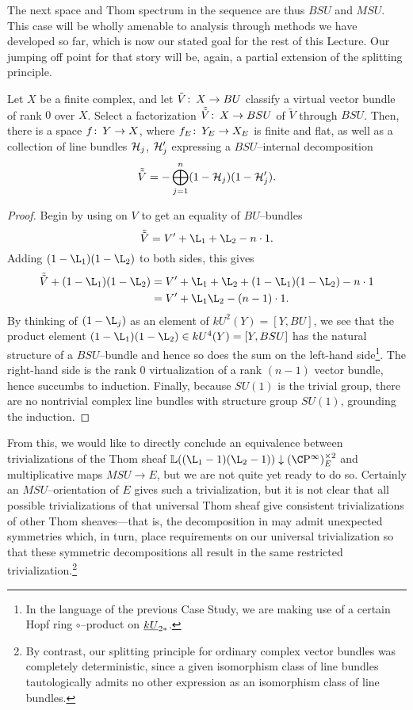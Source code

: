 The next space and Thom spectrum in the sequence are thus $BSU$ and $MSU$.  This case will be wholly amenable to analysis through methods we have developed so far, which is now our stated goal for the rest of this Lecture.  Our jumping off point for that story will be, again, a partial extension of the splitting principle.
\begin{lemma}\label{SplittingPrincipleForBSU}
Let $X$ be a finite complex, and let $\tilde V\colon\thinspace X \to BU$ classify a virtual vector bundle of rank $0$ over $X$.  Select a factorization $\tilde{\tilde V}\colon\thinspace X \to BSU$ of $\tilde V$ through $BSU$.  Then, there is a space $f\colon\thinspace Y \to X$, where $f_E\colon\thinspace Y_E \to X_E$ is finite and flat, as well as a collection of line bundles $\mathcal{H}_j$, $\mathcal{H}'_j$ expressing a $BSU$--internal decomposition \[\tilde{\tilde V} = -\bigoplus_{j=1}^n (1 - \mathcal{H}_j)(1 - \mathcal{H}'_j).\]
\end{lemma}
\begin{proof}
Begin by using  on $V$ to get an equality of $BU$--bundles \[\tilde{\tilde V} = V' + \L_1 + \L_2 - n \cdot 1.\]  Adding $(1 - \L_1)(1 - \L_2)$ to both sides, this gives
\begin{align*}
\tilde{\tilde V} + (1 - \L_1)(1 - \L_2) & = V' + \L_1 + \L_2 + (1 - \L_1)(1 - \L_2) - n \cdot 1 \\
& = V' + \L_1\L_2 - (n-1) \cdot 1.
\end{align*}
By thinking of $(1 - \L_j)$ as an element of $kU^2(Y) = [Y, BU]$, we see that the product element $(1 - \L_1)(1 - \L_2) \in kU^4(Y) = [Y, BSU]$ has the natural structure of a $BSU$--bundle and hence so does the sum on the left-hand side\footnote{In the language of the previous Case Study, we are making use of a certain Hopf ring $\circ$--product on $\underline{\smash{kU}}_{2*}$.}.  The right-hand side is the rank $0$ virtualization of a rank $(n-1)$ vector bundle, hence succumbs to induction.  Finally, because $SU(1)$ is the trivial group, there are no nontrivial complex line bundles with structure group $SU(1)$, grounding the induction.
\end{proof}

From this, we would like to directly conclude an equivalence between trivializations of the Thom sheaf $\ThomSheaf{(\L_1 - 1)(\L_2 - 1)} \downarrow (\CP^\infty)^{\times 2}_E$ and multiplicative maps $MSU \to E$, but we are not quite yet ready to do so.  Certainly an $MSU$--orientation of $E$ gives such a trivialization, but it is not clear that all possible trivializations of that universal Thom sheaf give consistent trivializations of other Thom sheaves---that is, the decomposition in  may admit unexpected symmetries which, in turn, place requirements on our universal trivialization so that these symmetric decompositions all result in the same restricted trivialization.\footnote{By contrast, our splitting principle for ordinary complex vector bundles was completely deterministic, since a given isomorphism class of line bundles tautologically admits no other expression as an isomorphism class of line bundles.}

